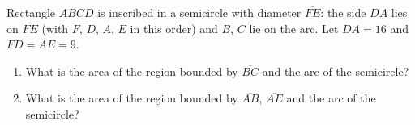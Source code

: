 Rectangle $ABCD$ is inscribed in a semicircle with diameter $\overline{FE}$: the side $DA$ lies on $\overline{FE}$ (with $F$, $D$, $A$, $E$ in this order) and $B$, $C$ lie on the arc. Let $DA=16$ and $FD=AE=9$.
\begin{enumerate}
\item[(a)] What is the area of the region bounded by $\overline{BC}$ and the arc of the semicircle?
\item[(b)] What is the area of the region bounded by $\overline{AB}$, $\overline{AE}$ and the arc of the semicircle?
\end{enumerate}
